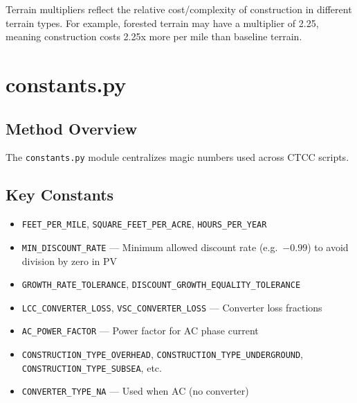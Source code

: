 \documentclass[ctcc_full_documentation.tex]{subfiles}
\begin{document}
Terrain multipliers reflect the relative cost/complexity of construction in different terrain types. For example, forested terrain may have a multiplier of 2.25, meaning construction costs 2.25x more per mile than baseline terrain.

\section{constants.py}

\subsection{Method Overview}

The \texttt{constants.py} module centralizes magic numbers used across CTCC scripts.

\subsection{Key Constants}

\begin{itemize}
    \item \texttt{FEET\_PER\_MILE}, \texttt{SQUARE\_FEET\_PER\_ACRE}, \texttt{HOURS\_PER\_YEAR}
    \item \texttt{MIN\_DISCOUNT\_RATE} --- Minimum allowed discount rate (e.g.\ $-0.99$) to avoid division by zero in PV
    \item \texttt{GROWTH\_RATE\_TOLERANCE}, \texttt{DISCOUNT\_GROWTH\_EQUALITY\_TOLERANCE}
    \item \texttt{LCC\_CONVERTER\_LOSS}, \texttt{VSC\_CONVERTER\_LOSS} --- Converter loss fractions
    \item \texttt{AC\_POWER\_FACTOR} --- Power factor for AC phase current
    \item \texttt{CONSTRUCTION\_TYPE\_OVERHEAD}, \texttt{CONSTRUCTION\_TYPE\_UNDERGROUND}, \texttt{CONSTRUCTION\_TYPE\_SUBSEA}, etc.
    \item \texttt{CONVERTER\_TYPE\_NA} --- Used when AC (no converter)
\end{itemize}
\end{document}
